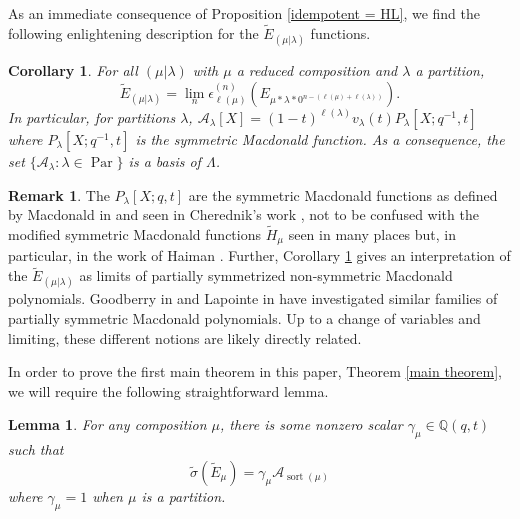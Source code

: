 \documentclass[11pt]{article}
\newtheorem{lemm}[theo]{Lemma}
\newtheorem{coro}[theo]{Corollary}
\theoremstyle{definition}
\newtheorem{rema}[theo]{Remark}
\numberwithin{equation}{section}
\DeclareMathOperator{\sort}{sort}
\DeclareMathOperator{\Par}{\mathrm{Par}}
\begin{document}
As an immediate consequence of Proposition \ref{idempotent = HL}, we find the following enlightening description for the $\widetilde{E}_{(\mu|\lambda)}$ functions.

\begin{coro}\label{alternative description of E's}\label{A lambdas are basis}
    For all $(\mu|\lambda)$ with $\mu$ a reduced composition and $\lambda$ a partition,
    \begin{equation}
        \widetilde{E}_{(\mu|\lambda)} = \lim_{n} \epsilon_{\ell(\mu)}^{(n)}(E_{\mu*\lambda*0^{n-(\ell(\mu)+\ell(\lambda))}}).
    \end{equation}
    In particular, for partitions $\lambda$, $\mathcal{A}_{\lambda}[X] = (1-t)^{\ell(\lambda)} v_{\lambda}(t)P_{\lambda}[X;q^{-1},t]$ where $P_{\lambda}[X;q^{-1},t]$ is the symmetric Macdonald function. As a consequence, the set $\{ \mathcal{A}_{\lambda} : \lambda \in \Par \}$ is a basis of $\Lambda$.
\end{coro}

\begin{rema}
    The $P_{\lambda}[X;q,t]$ are the symmetric Macdonald functions as defined by Macdonald in \cite[Chapter 4, Section 4, (4.7)]{Macdonald} and seen in Cherednik's work \cite{C_2003}, not to be confused with the modified symmetric Macdonald functions $\widetilde{H}_{\mu}$ seen in many places but, in particular, in the work of Haiman \cite{HVanish}. Further, Corollary \ref{alternative description of E's} gives an interpretation of the $\widetilde{E}_{(\mu|\lambda)}$ as limits of partially symmetrized non-symmetric Macdonald polynomials. Goodberry in \cite{Goodberry} and Lapointe in \cite{lapointe2022msymmetric} have investigated similar families of partially symmetric Macdonald polynomials. Up to a change of variables and limiting, these different notions are likely directly related. 
\end{rema}

In order to prove the first main theorem in this paper, Theorem \ref{main theorem}, we will require the following straightforward lemma. 

\begin{lemm} \label{permuting and A lambdas}
For any composition $\mu$, there is some nonzero scalar $\gamma_{\mu} \in \mathbb{Q}(q,t)$ such that 
$$ \widetilde{\sigma}( \widetilde{E}_{\mu} ) = \gamma_{\mu} \mathcal{A}_{\sort(\mu)} $$
where $\gamma_{\mu} = 1$ when $\mu$ is a partition.
\end{lemm}
\end{document}
